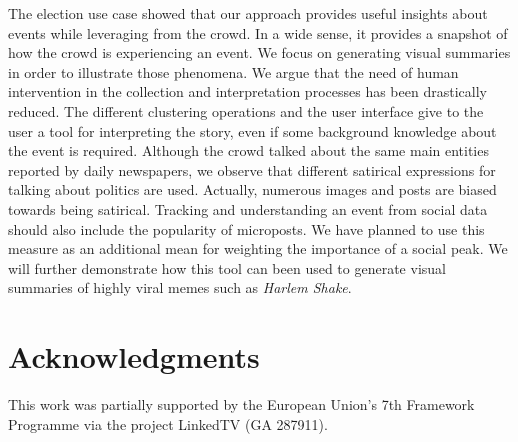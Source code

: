 \documentclass{llncs}
\begin{document}
The election use case showed that our approach provides useful insights about events while leveraging from the crowd. In a wide sense, it provides a snapshot of how the crowd is experiencing an event. We focus on generating visual summaries in order to illustrate those phenomena. We argue that the need of human intervention in the collection and interpretation processes has been drastically reduced. The different clustering operations and the user interface give to the user a tool for interpreting the story, even if some background knowledge about the event is required. Although the crowd talked about the same main entities reported by daily newspapers, we observe that different satirical expressions for talking about politics are used. Actually, numerous images and posts are biased towards being satirical. Tracking and understanding an event from social data should also include the popularity of microposts. We have planned to use this measure as an additional mean for weighting the importance of a social peak. We will further demonstrate how this tool can been used to generate visual summaries of highly viral memes such as \emph{Harlem Shake}.


\section*{Acknowledgments}
This work was partially supported by the European Union's 7th Framework Programme via the project LinkedTV (GA 287911).



\end{document}
